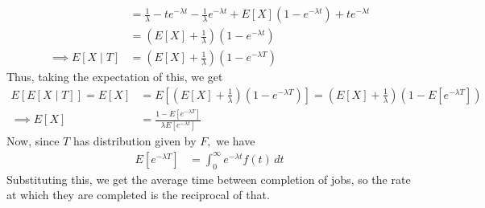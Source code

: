 \documentclass{article}
\begin{document}
\begin{itemize}
\begin{soln}
\begin{align*}
				&= \frac{1}{\lambda} - te^{-\lambda t} - \frac{1}{\lambda} e^{-\lambda t} + E[X](1-e^{-\lambda t}) + te^{-\lambda t} \\
				&= \left( E[X] + \frac{1}{\lambda} \right)(1-e^{-\lambda t}) \\
				\implies E[X\mid T] &= \left( E[X]+\frac{1}{\lambda} \right)(1-e^{-\lambda T})
			\end{align*}
			Thus, taking the expectation of this, we get
			\begin{align*}
				E[E[X\mid T]] = E[X] &= E\left[ \left( E[X] + \frac{1}{\lambda} \right)(1-e^{-\lambda T}) \right] = \left( E[X] + \frac{1}{\lambda} \right) \left( 1-E[e^{-\lambda T}] \right) \\
				\implies E[X] &= \frac{1-E[e^{-\lambda T}]}{\lambda E[e^{-\lambda t}]}
			\end{align*}
			Now, since $T$ has distribution given by $F,$ we have
			\begin{align*}
				E[e^{-\lambda T}] &= \int_0^\infty e^{-\lambda t} f(t)\, dt
			\end{align*}
			Substituting this, we get the average time between completion of jobs, so the rate at which they are completed is the reciprocal of that.
		\end{soln}


\end{itemize}
\end{document}
